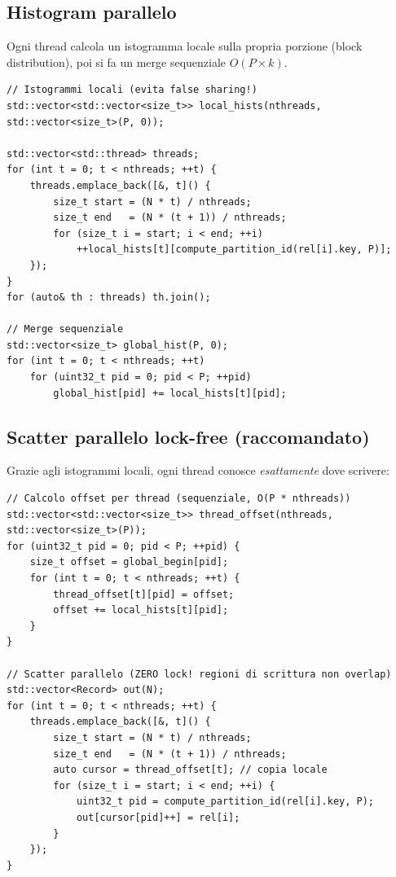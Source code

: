 \documentclass[11pt,a4paper]{article}
\begin{document}
\subsection{Histogram parallelo}

Ogni thread calcola un istogramma locale sulla propria porzione (block distribution), poi si fa un merge sequenziale $O(P \times k)$.

\begin{lstlisting}[style=cpp,caption={Histogram parallelo con istogrammi locali}]
// Istogrammi locali (evita false sharing!)
std::vector<std::vector<size_t>> local_hists(nthreads, std::vector<size_t>(P, 0));

std::vector<std::thread> threads;
for (int t = 0; t < nthreads; ++t) {
    threads.emplace_back([&, t]() {
        size_t start = (N * t) / nthreads;
        size_t end   = (N * (t + 1)) / nthreads;
        for (size_t i = start; i < end; ++i)
            ++local_hists[t][compute_partition_id(rel[i].key, P)];
    });
}
for (auto& th : threads) th.join();

// Merge sequenziale
std::vector<size_t> global_hist(P, 0);
for (int t = 0; t < nthreads; ++t)
    for (uint32_t pid = 0; pid < P; ++pid)
        global_hist[pid] += local_hists[t][pid];
\end{lstlisting}

\subsection{Scatter parallelo lock-free (raccomandato)}

Grazie agli istogrammi locali, ogni thread conosce \emph{esattamente} dove scrivere:

\begin{lstlisting}[style=cpp,caption={Offset per-thread-per-partizione + scatter senza lock}]
// Calcolo offset per thread (sequenziale, O(P * nthreads))
std::vector<std::vector<size_t>> thread_offset(nthreads, std::vector<size_t>(P));
for (uint32_t pid = 0; pid < P; ++pid) {
    size_t offset = global_begin[pid];
    for (int t = 0; t < nthreads; ++t) {
        thread_offset[t][pid] = offset;
        offset += local_hists[t][pid];
    }
}

// Scatter parallelo (ZERO lock! regioni di scrittura non overlap)
std::vector<Record> out(N);
for (int t = 0; t < nthreads; ++t) {
    threads.emplace_back([&, t]() {
        size_t start = (N * t) / nthreads;
        size_t end   = (N * (t + 1)) / nthreads;
        auto cursor = thread_offset[t]; // copia locale
        for (size_t i = start; i < end; ++i) {
            uint32_t pid = compute_partition_id(rel[i].key, P);
            out[cursor[pid]++] = rel[i];
        }
    });
}
\end{lstlisting}
\end{document}
